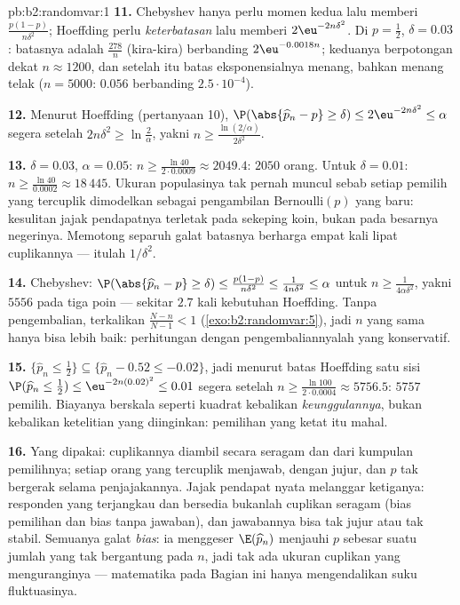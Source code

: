 \begin{solution}{pb:b2:randomvar:1}
\textbf{11.} Chebyshev hanya perlu momen kedua lalu memberi
$\frac{p(1-p)}{n\delta^2}$; Hoeffding perlu
\emph{keterbatasan} lalu memberi $2\eu^{-2n\delta^2}$. Di $p =
\frac12$, $\delta = 0.03$: batasnya adalah
$\frac{278}{n}$ (kira-kira) berbanding
$2\eu^{-0.0018n}$; keduanya berpotongan dekat $n \approx 1200$, dan setelah
itu batas eksponensialnya menang, bahkan menang telak ($n = 5000$:
$0.056$ berbanding $2.5\cdot10^{-4}$).

\textbf{12.} Menurut Hoeffding (pertanyaan 10), $\P(\abs{\widehat
p_n - p} \geq \delta) \leq 2\eu^{-2n\delta^2} \leq \alpha$ segera
setelah $2n\delta^2 \geq \ln\frac2\alpha$, yakni $n \geq
\frac{\ln(2/\alpha)}{2\delta^2}$.

\textbf{13.} $\delta = 0.03$, $\alpha = 0.05$: $n \geq
\frac{\ln 40}{2\cdot0.0009} \approx 2049.4$: $2050$ orang.
Untuk $\delta = 0.01$: $n \geq \frac{\ln40}{0.0002} \approx
18\,445$. Ukuran populasinya tak pernah muncul sebab setiap
pemilih yang tercuplik dimodelkan sebagai pengambilan Bernoulli$(p)$ yang baru:
kesulitan jajak pendapatnya terletak pada  sekeping koin, bukan pada besarnya
negerinya. Memotong separuh galat batasnya berharga empat kali lipat cuplikannya
--- itulah  $1/\delta^2$.

\textbf{14.} Chebyshev: $\P(\abs{\widehat p_n - p} \geq
\delta) \leq \frac{p(1-p)}{n\delta^2} \leq
\frac1{4n\delta^2} \leq \alpha$ untuk $n \geq
\frac1{4\alpha\delta^2}$, yakni $5556$ pada tiga poin ---
sekitar $2.7$ kali kebutuhan Hoeffding. Tanpa
pengembalian,  terkalikan $\frac{N -
n}{N-1} < 1$ (\cref{exo:b2:randomvar:5}), jadi $n$ yang sama hanya
bisa lebih baik: perhitungan dengan pengembaliannyalah yang konservatif.

\textbf{15.} $\{\widehat p_n \leq \frac12\} \subseteq
\{\widehat p_n - 0.52 \leq -0.02\}$, jadi menurut batas
Hoeffding satu sisi $\P(\widehat p_n \leq \tfrac12) \leq
\eu^{-2n(0.02)^2} \leq 0.01$ segera setelah $n \geq \frac{\ln
100}{2\cdot0.0004} \approx 5756.5$: $5757$ pemilih. Biayanya
berskala seperti kuadrat kebalikan \emph{keunggulannya}, bukan kebalikan
ketelitian yang diinginkan: pemilihan yang ketat itu mahal.

\textbf{16.} Yang dipakai: cuplikannya diambil secara seragam dan
 dari kumpulan pemilihnya; setiap orang yang tercuplik
menjawab, dengan jujur, dan $p$ tak bergerak selama penjajakannya. Jajak
pendapat nyata melanggar ketiganya: responden yang terjangkau dan bersedia
bukanlah cuplikan seragam (bias pemilihan dan bias tanpa jawaban),
dan jawabannya bisa tak jujur atau tak stabil. Semuanya galat
\emph{bias}: ia menggeser $\E(\widehat p_n)$ menjauhi $p$
sebesar suatu jumlah yang tak bergantung pada $n$, jadi tak ada ukuran
cuplikan yang menguranginya --- matematika pada Bagian ini hanya mengendalikan
suku fluktuasinya.


\end{solution}
